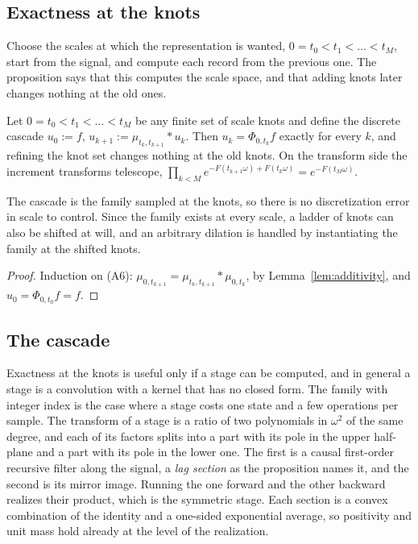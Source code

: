 

\subsection{Exactness at the knots}\label{sec:knots}

Choose the scales at which the representation is wanted, $0 = t_0 < t_1 < \dots < t_M$, start
from the signal, and compute each record from the previous one. The proposition says that
this computes the scale space, and that adding knots later changes nothing at the old ones.

\begin{proposition}\label{prop:knot-exactness}
Let $0 = t_0 < t_1 < \dots < t_M$ be any finite set of scale knots and define the discrete
cascade $u_0 := f$, $u_{k+1} := \mu_{t_k,t_{k+1}} * u_k$. Then $u_k = \Phi_{0,t_k}f$ exactly for
every $k$, and refining the knot set changes nothing at the old knots. On the transform side the
increment transforms telescope,
$\prod_{k<M} e^{-F(t_{k+1}\omega) + F(t_k\omega)} = e^{-F(t_M\omega)}$.
\end{proposition}

The cascade is the family sampled at the knots, so there is no discretization error in scale
to control. Since the family exists at every scale, a ladder of knots can also be shifted at will,
and an arbitrary dilation is handled by instantiating the family at the shifted knots.

\begin{proof}
Induction on (A6): $\mu_{0,t_{k+1}} = \mu_{t_k,t_{k+1}} * \mu_{0,t_k}$, by
Lemma~\ref{lem:additivity}, and $u_0 = \Phi_{0,t_0}f = f$.
\end{proof}

\subsection{The \texorpdfstring{\Matern{}}{Matern} cascade}\label{sec:matern-cascade}

Exactness at the knots is useful only if a stage can be computed, and in general a stage is a
convolution with a kernel that has no closed form. The \Matern{} family with integer index is
the case where a stage costs one state and a few operations per sample. The transform of a
stage is a ratio of two polynomials in $\omega^2$ of the same degree, and each of its factors
splits into a part with its pole in the upper half-plane and a part with its pole in the lower
one. The first is a causal first-order recursive filter along the signal, a \emph{lag section} as
the proposition names it, and the second is its mirror image. Running the one forward and the
other backward realizes their product, which is the symmetric stage. Each section is a convex
combination of the identity and a one-sided exponential average, so positivity and unit mass
hold already at the level of the realization.

